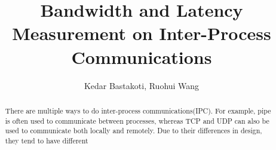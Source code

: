 \documentclass[10pt]{article}
\begin{document}
\title{Bandwidth and Latency Measurement on Inter-Process Communications}
\author{Kedar Bastakoti, Ruohui Wang}
\date{}

\begin{abstract}
    There are multiple ways to do inter-process communications(IPC). For example, pipe is often used to communicate between processes, whereas TCP and UDP can also be used to communicate both locally and remotely. Due to their differences in design, they tend to have different
\end{abstract}

\maketitle







    
\end{document}
